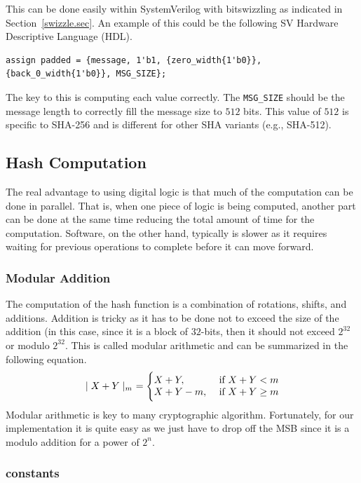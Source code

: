 \documentclass{article}
\begin{document}
This can be done easily within SystemVerilog with bitswizzling as
indicated in Section~\ref{swizzle.sec}.
An example of this could be the following SV Hardware Descriptive
Language (HDL).
\begin{verbatim}
assign padded = {message, 1'b1, {zero_width{1'b0}},  {back_0_width{1'b0}}, MSG_SIZE};
\end{verbatim}
The key to this is computing each value correctly.  The
\verb!MSG_SIZE! should be the message length to correctly fill the
message size to $512$ bits.  This value of $512$ is specific to
SHA-256 and is different for other SHA variants (e.g., SHA-512).


\subsection{Hash Computation}

The real advantage to using digital logic is that much of the
computation can be done in parallel.  That is, when one piece of logic
is being computed, another part can be done at the same time reducing
the total amount of time for the computation.  Software, on the other
hand, typically is slower as it requires waiting for previous
operations to complete before it can move forward.

\subsubsection{Modular Addition}
\label{modular.sec}

The computation of the hash function is a combination of rotations,
shifts, and additions.  Addition is tricky as it has to be done not to
exceed the size of the addition (in this case, since it is a block of
$32$-bits, then it should not exceed $2^{32}$ or modulo $2^{32}$.  This is
called modular arithmetic and can be summarized in the following equation.
\begin{eqnarray*}
  \mid X+Y \mid_m ~= \Biggl\{
   \begin{array}{@{}ll@{}}
      X+Y,      & \text{ if $X+Y < m$}  \\
      X+Y-m,    & \text{ if $X+Y \geq m$} 
   \end{array}
\end{eqnarray*}  
Modular arithmetic is key to many cryptographic algorithm.
Fortunately, for our implementation it is quite easy as we just have
to drop off the MSB since it is a modulo addition for a power of $2^n$.

\subsubsection{constants}
\label{constants.sec}
\end{document}
